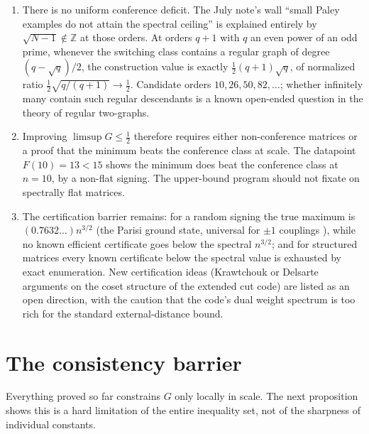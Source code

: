 \documentclass[11pt]{article}
\theoremstyle{remark}
\begin{document}
\begin{enumerate}
\item There is no uniform conference deficit. The July note's wall
``small Paley examples do not attain the spectral ceiling'' is
explained entirely by $\sqrt{N-1}\notin\mathbb Z$ at those orders. At
orders $q+1$ with $q$ an even power of an odd prime, whenever the
switching class contains a regular graph of degree $(q-\sqrt q)/2$,
the construction value is exactly $\tfrac12(q+1)\sqrt q$, of
normalized ratio $\tfrac12\sqrt{q/(q+1)}\to\tfrac12$. Candidate orders
$10,26,50,82,\dots$; whether infinitely many contain such regular
descendants is a known open-ended question in the theory of regular
two-graphs.
\item Improving $\limsup G\le\tfrac12$ therefore requires either
non-conference matrices or a proof that the minimum beats the
conference class at scale. The datapoint $F(10)=13<15$ shows the
minimum does beat the conference class at $n=10$, by a non-flat
signing. The upper-bound program should not fixate on spectrally flat
matrices.
\item The certification barrier remains: for a random signing the true
maximum is $(0.7632\ldots)n^{3/2}$ (the Parisi ground state, universal
for $\pm1$ couplings \cite{parisi-gs,gt}), while no known efficient
certificate goes below the spectral $n^{3/2}$; and for structured
matrices every known certificate below the spectral value is exhausted
by exact enumeration. New certification ideas (Krawtchouk or Delsarte
arguments on the coset structure of the extended cut code) are listed
as an open direction, with the caution that the code's dual weight
spectrum is too rich for the standard external-distance bound.
\end{enumerate}

\section{The consistency barrier}\label{sec:barrier}

Everything proved so far constrains $G$ only locally in scale. The
next proposition shows this is a hard limitation of the entire
inequality set, not of the sharpness of individual constants.
\end{document}
